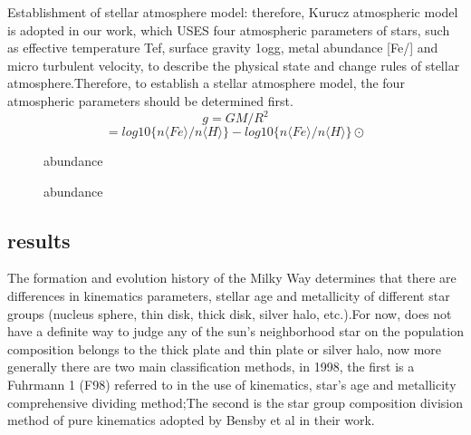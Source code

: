 \documentclass{aastex62}
\begin{document}
        
        Establishment of stellar atmosphere model: therefore, Kurucz atmospheric model is adopted in our work, which USES four atmospheric parameters of stars, such as effective temperature Tef, surface gravity 1ogg, metal abundance [Fe/] and micro turbulent velocity, to describe the physical state and change rules of stellar atmosphere.Therefore, to establish a stellar atmosphere model, the four atmospheric parameters should be determined first.
\begin{equation}
g=GM/R^2
\end{equation}
\begin{equation}
[Fe/H]=log10\lbrace n\langle Fe\rangle/n\langle H\rangle\rbrace-log10\lbrace n\langle Fe\rangle/n\langle H\rangle\rbrace \odot
\end{equation}

\begin{figure}[ht!]
\caption{abundance}
\end{figure}
\begin{figure}[ht!]
\caption{abundance}
\end{figure}
\subsection{results}
    The formation and evolution history of the Milky Way determines that there are differences in kinematics parameters, stellar age and metallicity of different star groups (nucleus sphere, thin disk, thick disk, silver halo, etc.).For now, does not have a definite way to judge any of the sun's neighborhood star on the population composition belongs to the thick plate and thin plate or silver halo, now more generally there are two main classification methods, in 1998, the first is a Fuhrmann 1 (F98) referred to in the use of kinematics, star's age and metallicity comprehensive dividing method;The second is the star group composition division method of pure kinematics adopted by Bensby et al in their work.
\end{document}
